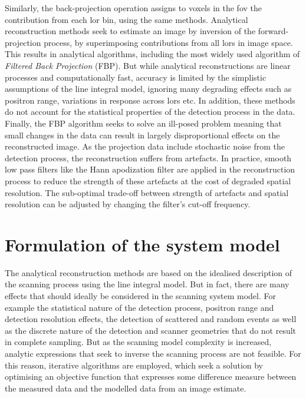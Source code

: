 Similarly, the back-projection operation assigns to voxels in the \gls{fov} the contribution from each \gls{lor} bin, using the same methods.
Analytical reconstruction methods seek to estimate an image by inversion of the forward-projection process, by superimposing contributions from all \glspl{lor} in image space. 
This results in analytical algorithms, including the most widely used algorithm of \textit{Filtered Back Projection} (FBP).
But while analytical reconstructions are linear processes and computationally fast, accuracy is limited by the simplistic assumptions of the line integral model, ignoring many degrading effects such as positron range, variations in response across \glspl{lor} etc. In addition, these methods do not account for the statistical properties of the detection process in the data.
Finally, the FBP algorithm seeks to solve an ill-posed problem meaning that small changes in the data can result in largely disproportional effects on the reconstructed image. As the projection data include stochastic noise from the detection process, the reconstruction suffers from artefacts. In practice, smooth low pass filters like the Hann apodization filter are applied in the reconstruction process to reduce the strength of these artefacts at the cost of degraded spatial resolution. The sub-optimal trade-off between strength of artefacts and spatial resolution can be adjusted by changing the filter's cut-off frequency.

\section{Formulation of the system model}
The analytical reconstruction methods are based on the idealised description of the scanning process using the line integral model. But in fact, there are many effects that should ideally be considered in the scanning system model. For example the statistical nature of the detection process, positron range and detection resolution effects, the detection of scattered and random events as well as the discrete nature of the detection and scanner geometries that do not result in complete sampling.
But as the scanning model complexity is increased, analytic expressions that seek to inverse the scanning process are not feasible.
For this reason, iterative algorithms are employed, which seek a solution by optimising an objective function that expresses some difference measure between the measured data and the modelled data from an image estimate.

